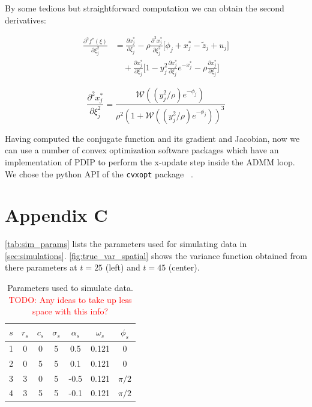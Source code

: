\documentclass{article}
\newcommand{\attn}[1]{\textcolor{red}{TODO: #1}}
\begin{document}
By some tedious but straightforward computation we can obtain the second derivatives:


\begin{align}
\frac{\partial^2 f^*(\xi)}{\partial \xi_j^2} & =  \frac{\partial x_j^*}{\partial \xi_j} - \rho \frac{\partial^2 x_j^*}{\partial \xi_j^2} \bigg[ \phi_j +x_j^* - \tilde{z}_j + u_j \bigg]\\
& \quad + \frac{\partial x_j^*}{\partial \xi_j} \bigg[ 1-y_j^2 \frac{\partial x_j^*}{\partial \xi_j} e^{-x_j^*} -\rho \frac{\partial x_j^*}{\partial \xi_j} \bigg]
\label{eq:d2_f*_start}
\end{align}


\begin{equation}
\frac{\partial^2 x_j^*}{\partial \xi_j^2}  = \frac{\mathscr{W}((y_j^2/\rho) e^{-\phi_j} )}{\rho^2(1+\mathscr{W}((y_j^2/\rho) e^{-\phi_j} ))^3}
\label{eq:d2_x*_start}
\end{equation}

Having computed the conjugate function and its gradient and Jacobian, now we can use a number of convex optimization software packages which have an implementation of PDIP to perform the x-update step inside the ADMM loop. We chose the python API of the \texttt{cvxopt} package ~\citep{andersen_cvxopt:_2013}. 

\section{Appendix C}
\autoref{tab:sim_params} lists the parameters used for simulating data
in \autoref{sec:simulations}. \autoref{fig:true_var_spatial} shows the
variance function obtained from there parameters at $t=25$ (left) and
$t=45$ (center). 

\begin{table}[tb]
  \caption{Parameters used to simulate data. \attn{Any ideas to take
      up less space with this info?}}
  \label{tab:sim_params}
  \begin{center}
    \begin{tabular}{ccccccc}
      \hline
      $s$ & $r_s$ & $c_s$ & $\sigma_s$ &$\alpha_s$ & $\omega_s$ & $\phi_s$\\
      \hline
      1 & 0 & 0 & 5 & 0.5 & 0.121 & 0 \\
      2 & 0 & 5 & 5 & 0.1 & 0.121 & 0 \\
      3 & 3 & 0 & 5 & -0.5 & 0.121 & $\pi/2$ \\
      4 & 3 & 5 & 5 & -0.1 & 0.121 & $\pi/2$ \\
      \hline
    \end{tabular}
  \end{center}
\end{table} 
\end{document}
